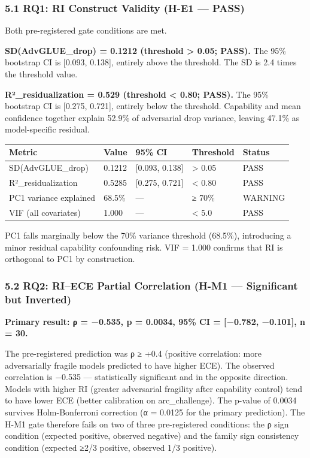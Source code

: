 
\subsubsection{5.1 RQ1: RI Construct Validity (H-E1 — PASS)}

Both pre-registered gate conditions are met.

\textbf{SD(AdvGLUE_drop) = 0.1212 (threshold > 0.05; PASS).} The 95\% bootstrap CI is [0.093, 0.138], entirely above the threshold. The SD is 2.4 times the threshold value.

\textbf{R²_residualization = 0.529 (threshold < 0.80; PASS).} The 95\% bootstrap CI is [0.275, 0.721], entirely below the threshold. Capability and mean confidence together explain 52.9\% of adversarial drop variance, leaving 47.1\% as model-specific residual.

\begin{table}[htbp]
\centering
\begin{tabular}{lllll}
\toprule
Metric & Value & 95\% CI & Threshold & Status \\
\midrule
SD(AdvGLUE_drop) & 0.1212 & [0.093, 0.138] & > 0.05 & PASS \\
R²_residualization & 0.5285 & [0.275, 0.721] & < 0.80 & PASS \\
PC1 variance explained & 68.5\% & — & ≥ 70\% & WARNING \\
VIF (all covariates) & 1.000 & — & < 5.0 & PASS \\
\bottomrule
\end{tabular}
\end{table}

PC1 falls marginally below the 70\% variance threshold (68.5\%), introducing a minor residual capability confounding risk. VIF = 1.000 confirms that RI is orthogonal to PC1 by construction.

\subsubsection{5.2 RQ2: RI–ECE Partial Correlation (H-M1 — Significant but Inverted)}

\textbf{Primary result: ρ = −0.535, p = 0.0034, 95\% CI = [−0.782, −0.101], n = 30.}

The pre-registered prediction was ρ ≥ +0.4 (positive correlation: more adversarially fragile models predicted to have higher ECE). The observed correlation is −0.535 — statistically significant and in the opposite direction. Models with higher RI (greater adversarial fragility after capability control) tend to have lower ECE (better calibration on arc_challenge). The p-value of 0.0034 survives Holm-Bonferroni correction (α = 0.0125 for the primary prediction). The H-M1 gate therefore fails on two of three pre-registered conditions: the ρ sign condition (expected positive, observed negative) and the family sign consistency condition (expected ≥2/3 positive, observed 1/3 positive).


